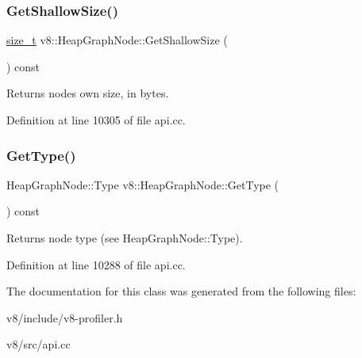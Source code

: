 \subsubsection{\texorpdfstring{Get\+Shallow\+Size()}{GetShallowSize()}}
{\footnotesize\ttfamily \mbox{\hyperlink{classsize__t}{size\+\_\+t}} v8\+::\+Heap\+Graph\+Node\+::\+Get\+Shallow\+Size (\begin{DoxyParamCaption}{ }\end{DoxyParamCaption}) const}

Returns node\textquotesingle{}s own size, in bytes. 

Definition at line 10305 of file api.\+cc.

\mbox{\label{classv8_1_1HeapGraphNode_a93db89e657229ddc9820beb1b6dad046}} 
\subsubsection{\texorpdfstring{Get\+Type()}{GetType()}}
{\footnotesize\ttfamily Heap\+Graph\+Node\+::\+Type v8\+::\+Heap\+Graph\+Node\+::\+Get\+Type (\begin{DoxyParamCaption}{ }\end{DoxyParamCaption}) const}

Returns node type (see Heap\+Graph\+Node\+::\+Type). 

Definition at line 10288 of file api.\+cc.



The documentation for this class was generated from the following files\+:\begin{DoxyCompactItemize}
\item 
v8/include/v8-\/profiler.\+h\item 
v8/src/api.\+cc\end{DoxyCompactItemize}
